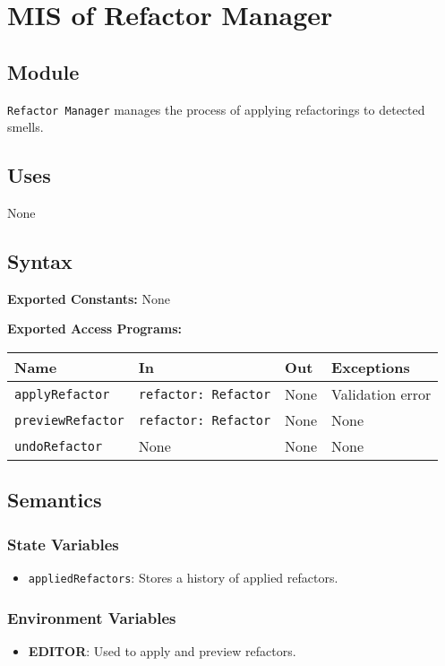\documentclass[12pt, titlepage]{article}
\begin{document}
\section{MIS of Refactor Manager}

\subsection{Module}
\texttt{Refactor Manager} manages the process of applying refactorings to detected smells.

\subsection{Uses}
None

\subsection{Syntax}

\textbf{Exported Constants:} None

\textbf{Exported Access Programs:}\\
\begin{tabularx}{\linewidth}{|l|>{\raggedright\arraybackslash}X|l|l|}
  \toprule Name & In & Out & Exceptions \\
  \midrule
  \texttt{applyRefactor} & \texttt{refactor: Refactor} & None & Validation error \\ \hline
  \texttt{previewRefactor} & \texttt{refactor: Refactor} & None & None \\ \hline
  \texttt{undoRefactor} & None & None & None \\
  \bottomrule
\end{tabularx}

\subsection{Semantics}

\subsubsection{State Variables}
\begin{itemize}
\item \texttt{appliedRefactors}: Stores a history of applied refactors.
\end{itemize}

\subsubsection{Environment Variables}
\begin{itemize}
\item \textbf{EDITOR}: Used to apply and preview refactors.
\end{itemize}
\end{document}
